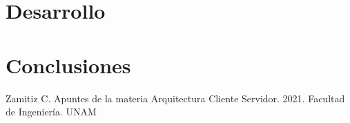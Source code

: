 \documentclass{article}
\begin{document}
\section{Desarrollo}




\section{Conclusiones}




\begin{thebibliography}{}

 Zamitiz C. Apuntes de la materia Arquitectura Cliente Servidor. 2021. Facultad de Ingeniería. UNAM

\end{thebibliography}
\end{document}
